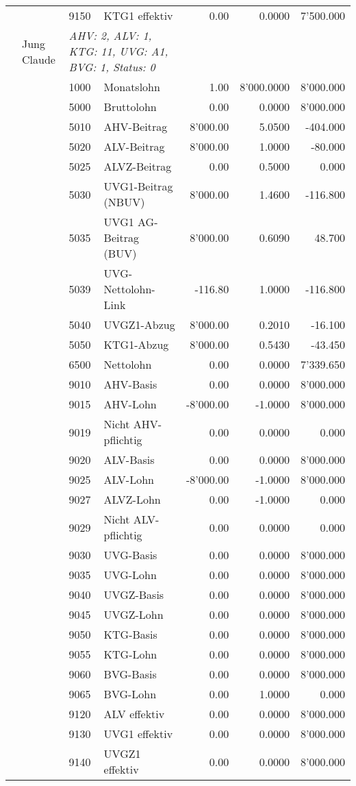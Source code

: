 \documentclass[15pt,a4paper]{article}
\begin{document}
\begin{longtable}{@{\extracolsep{\fill}}l l l l|r|r|r}
&&9150&KTG1 effektiv&0.00&0.0000&7'500.000\\
\pagebreak
13&Jung Claude&\multicolumn{2}{l|}{\small\emph{AHV: 2, ALV: 1, KTG: 11, UVG: A1, BVG: 1, Status: 0}}&& \\
&&1000&Monatslohn&1.00&8'000.0000&8'000.000\\
&&5000&Bruttolohn&0.00&0.0000&8'000.000\\
&&5010&AHV-Beitrag&8'000.00&5.0500&-404.000\\
&&5020&ALV-Beitrag&8'000.00&1.0000&-80.000\\
&&5025&ALVZ-Beitrag&0.00&0.5000&0.000\\
&&5030&UVG1-Beitrag (NBUV)&8'000.00&1.4600&-116.800\\
&&5035&UVG1 AG-Beitrag (BUV)&8'000.00&0.6090&48.700\\
&&5039&UVG-Nettolohn-Link&-116.80&1.0000&-116.800\\
&&5040&UVGZ1-Abzug&8'000.00&0.2010&-16.100\\
&&5050&KTG1-Abzug&8'000.00&0.5430&-43.450\\
&&6500&Nettolohn&0.00&0.0000&7'339.650\\
&&9010&AHV-Basis&0.00&0.0000&8'000.000\\
&&9015&AHV-Lohn&-8'000.00&-1.0000&8'000.000\\
&&9019&Nicht AHV-pflichtig&0.00&0.0000&0.000\\
&&9020&ALV-Basis&0.00&0.0000&8'000.000\\
&&9025&ALV-Lohn&-8'000.00&-1.0000&8'000.000\\
&&9027&ALVZ-Lohn&0.00&-1.0000&0.000\\
&&9029&Nicht ALV-pflichtig&0.00&0.0000&0.000\\
&&9030&UVG-Basis&0.00&0.0000&8'000.000\\
&&9035&UVG-Lohn&0.00&0.0000&8'000.000\\
&&9040&UVGZ-Basis&0.00&0.0000&8'000.000\\
&&9045&UVGZ-Lohn&0.00&0.0000&8'000.000\\
&&9050&KTG-Basis&0.00&0.0000&8'000.000\\
&&9055&KTG-Lohn&0.00&0.0000&8'000.000\\
&&9060&BVG-Basis&0.00&0.0000&8'000.000\\
&&9065&BVG-Lohn&0.00&1.0000&0.000\\
&&9120&ALV effektiv&0.00&0.0000&8'000.000\\
&&9130&UVG1 effektiv&0.00&0.0000&8'000.000\\
&&9140&UVGZ1 effektiv&0.00&0.0000&8'000.000\\

\end{longtable}
\end{document}

